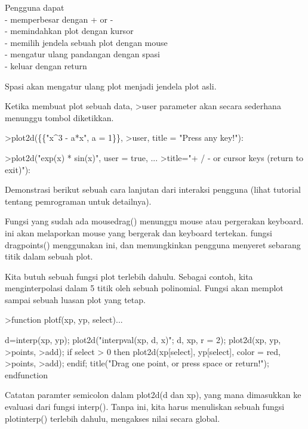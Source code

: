 \documentclass[a4paper,10pt]{article}
\begin{document}
\begin{eulernotebook}
\begin{eulercomment}
\begin{eulercomment}
\begin{eulercomment}
\begin{eulercomment}
\begin{eulercomment}
Pengguna dapat\\
- memperbesar dengan + or -\\
- memindahkan plot dengan kursor\\
- memilih jendela sebuah plot dengan mouse\\
- mengatur ulang pandangan dengan spasi\\
- keluar dengan return

Spasi akan mengatur ulang plot menjadi jendela plot asli.

Ketika membuat plot sebuah data, \textgreater{}user parameter akan secara sederhana
menunggu tombol diketikkan.
\end{eulercomment}
\begin{eulerprompt}
>plot2d(\{\{"x^3 - a*x", a = 1\}\}, >user, title = "Press any key!"):
\end{eulerprompt}
\begin{eulerprompt}
>plot2d("exp(x) * sin(x)", user = true, ...
>title="+ / - or cursor keys (return to exit)"):
\end{eulerprompt}
\begin{eulercomment}
Demonstrasi berikut sebuah cara lanjutan dari interaksi pengguna
(lihat tutorial tentang pemrograman untuk detailnya).

Fungsi yang sudah ada mousedrag() menunggu mouse atau pergerakan
keyboard. ini akan melaporkan mouse yang bergerak dan keyboard
tertekan. fungsi dragpoints() menggunakan ini, dan memungkinkan
pengguna menyeret sebarang titik dalam sebuah plot.

Kita butuh sebuah fungsi plot terlebih dahulu. Sebagai contoh, kita
menginterpolasi dalam 5 titik oleh sebuah polinomial. Fungsi akan
memplot sampai sebuah luasan plot yang tetap.
\end{eulercomment}
\begin{eulerprompt}
>function plotf(xp, yp, select)...
\end{eulerprompt}
\begin{eulerudf}
  d=interp(xp, yp);
  plot2d("interpval(xp, d, x)"; d, xp, r = 2);
  plot2d(xp, yp, >points, >add);
  if select > 0 then
     plot2d(xp[select], yp[select], color = red, >points, >add);
  endif;
  title("Drag one point, or press space or return!");
  endfunction
\end{eulerudf}
\begin{eulercomment}
Catatan paramter semicolon dalam plot2d(d dan xp), yang mana
dimasukkan ke evaluasi dari fungsi interp(). Tanpa ini, kita harus
menuliskan sebuah fungsi plotinterp() terlebih dahulu, mengakses nilai
secara global.


\end{eulercomment}
\end{eulercomment}
\end{eulercomment}
\end{eulercomment}
\end{eulercomment}
\end{eulernotebook}
\end{document}
